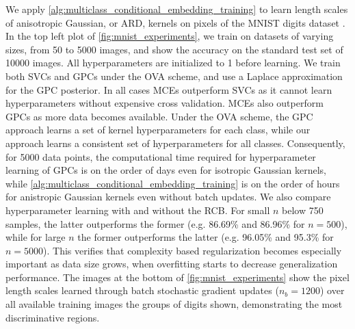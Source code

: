 \documentclass[twoside]{article}
\begin{document}
		We apply \cref{alg:multiclass_conditional_embedding_training} to learn length scales of anisotropic Gaussian, or \gls{ARD}, kernels on pixels of the MNIST digits dataset \citep{lecun1998gradient}. In the top left plot of \cref{fig:mnist_experiments}, we train on datasets of varying sizes, from 50 to 5000 images, and show the accuracy on the standard test set of 10000 images. All hyperparameters are initialized to 1 before learning. We train both \glspl{SVC} and \glspl{GPC} under the \gls{OVA} scheme, and use a Laplace approximation for the \gls{GPC} posterior. In all cases \glspl{MCE} outperform \glspl{SVC} as it cannot learn hyperparameters without expensive cross validation. \glspl{MCE} also outperform \glspl{GPC} as more data becomes available. Under the \gls{OVA} scheme, the \gls{GPC} approach learns a set of kernel hyperparameters for each class, while our approach learns a consistent set of hyperparameters for all classes. Consequently, for 5000 data points, the computational time required for hyperparameter learning of \glspl{GPC} is on the order of days even for isotropic Gaussian kernels, while \cref{alg:multiclass_conditional_embedding_training} is on the order of hours for anistropic Gaussian kernels even without batch updates. We also compare hyperparameter learning with and without the \gls{RCB}. For small $n$ below 750 samples, the latter outperforms the former (e.g. 86.69\% and 86.96\% for $n = 500$), while for large $n$ the former outperforms the latter (e.g. 96.05\% and 95.3\% for $n= 5000$). This verifies that complexity based regularization becomes especially important as data size grows, when overfitting starts to decrease generalization performance. The images at the bottom of \cref{fig:mnist_experiments} show the pixel length scales learned through batch stochastic gradient updates ($n_{b} = 1200$) over all available training images the groups of digits shown, demonstrating the most discriminative regions. %
	
		
\end{document}

